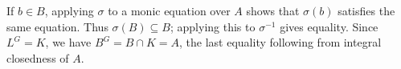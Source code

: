 If $b\in B$, applying $\sigma$ to a monic equation over $A$ shows that $\sigma(b)$ satisfies the same equation. Thus $\sigma(B)\subseteq B$; applying this to $\sigma^{-1}$ gives equality. Since $L^G=K$, we have $B^G=B\cap K=A$, the last equality following from integral closedness of $A$.
